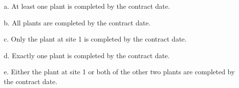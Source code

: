 \documentclass[letterpaper,12pt]{article}
\begin{document}
\begin{enumerate}
\begin{enumerate}
      \item[a.]
        At least one plant is completed by the contract date.
      \item[b.]
        All plants are completed by the contract date.
      \item[c.]
        Only the plant at site 1 is completed by the contract date.
      \item[d.]
        Exactly one plant is completed by the contract date.
      \item[e.]
        Either the plant at site 1 or both of the other two plants are completed by the contract date.
    \end{enumerate}
\end{enumerate}
\end{document}
